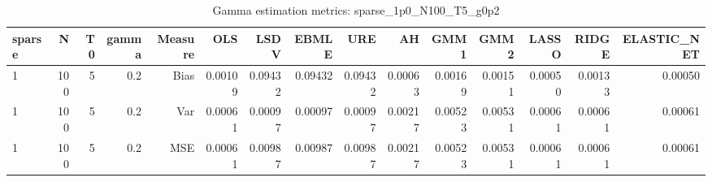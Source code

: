 \begin{table}[!htbp]\centering
\caption{Gamma estimation metrics: sparse_1p0_N100_T5_g0p2}
\label{tab:table1_sparse_1p0_N100_T5_g0p2}
\begin{tabular}{lrrrrrrrrrrrrrr}
\hline
sparse & N & T0 & gamma & Measure & OLS & LSDV & EBMLE & URE & AH & GMM1 & GMM2 & LASSO & RIDGE & ELASTIC_NET \\
\hline
1 & 100 & 5 & 0.2 & Bias & 0.00109 & 0.09432 & 0.09432 & 0.09432 & 0.00063 & 0.00169 & 0.00151 & 0.00050 & 0.00133 & 0.00050 \\
1 & 100 & 5 & 0.2 & Var & 0.00061 & 0.00097 & 0.00097 & 0.00097 & 0.00217 & 0.00523 & 0.00531 & 0.00061 & 0.00061 & 0.00061 \\
1 & 100 & 5 & 0.2 & MSE & 0.00061 & 0.00987 & 0.00987 & 0.00987 & 0.00217 & 0.00523 & 0.00531 & 0.00061 & 0.00061 & 0.00061 \\
\hline
\end{tabular}
\end{table}


